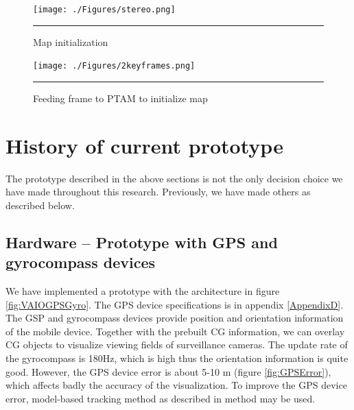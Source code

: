 \begin{figure}[htbp]
	\centering
	\texttt{[image: ./Figures/stereo.png]}
	\rule{35em}{0.5pt}
	\caption[Map initialization]{Map initialization}
	\label{fig:Stereo}
\end{figure}

\begin{figure}[htbp]
	\centering
	\texttt{[image: ./Figures/2keyframes.png]}
	\rule{35em}{0.5pt}
	\caption[Feeding frame to PTAM to initialize map]{Feeding frame to PTAM to initialize map}
	\label{fig:2KeyFrames}
\end{figure}


\section{History of current prototype}

The prototype described in the above sections is not the only decision choice we have made throughout this research. Previously, we have made others as described below.

\subsection{Hardware -- Prototype with GPS and gyrocompass devices}

We have implemented a prototype with the architecture in figure \ref{fig:VAIOGPSGyro}. The GPS device specifications is in appendix \ref{AppendixD}. The GSP and gyrocompass devices provide position and orientation information of the mobile device. Together with the prebuilt CG information, we can overlay CG objects to visualize viewing fields of surveillance cameras. The update rate of the gyrocompass is 180Hz, which is high thus the orientation information is quite good. However, the GPS device error is about 5-10 m (figure \ref{fig:GPSError}), which affects badly the accuracy of the visualization. To improve the GPS device error, model-based tracking method as described in \citep{Reference13} method may be used.

